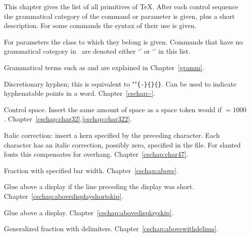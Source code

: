 
This chapter gives the list of all primitives of
\TeX. After each control sequence
the grammatical category of the command or parameter
is given, plus a short description. For some  commands
the syntax of their use is given.

For parameters the class to which they belong is given.
Commands that have no grammatical category
in \TeXbook\ are denoted either
`' or
`' in this list.

Grammatical terms such as  and 
are explained in Chapter~\ref{gramm}.

\begin{glossinventory}

\item [\cs{-}]
      Discretionary hyphen; this is
      equivalent to ""\verb|{-}{}{}|.
      Can be used to indicate hyphenatable points in a word. 
Chapter~\ref{cschap:-}.

\item [\cs{char32}]
      Control space.
      Insert the same amount of space as a space token would
 \alt
      if ${}=1000$.
Chapter~\ref{cschap:char32},\ref{cschap:char322}.

\item [\cs{char47}]
      Italic correction: insert a kern specified by the
      preceding character.
      Each character has an italic correction, possibly zero,
      specified in the  file.
      For slanted fonts this compensates for overhang.
Chapter~\ref{cschap:char47}.

\item [\cs{above\gr{dimen}}]
      Fraction with specified bar width. 
Chapter~\ref{cschap:above}.

\item [\cs{abovedisplayshortskip}]
      Glue above a display if the line preceding the display was short.
Chapter~\ref{cschap:abovedisplayshortskip}.

\item [\cs{abovedisplayskip}]
      Glue above a display.
Chapter~\ref{cschap:abovedisplayskip}.

\item [\cs{abovewithdelims\gr{delim$_1$}\gr{delim$_2$}\gr{dimen}}]
      Generalized fraction with delimiters.
Chapter~\ref{cschap:abovewithdelims}.


\end{glossinventory}
